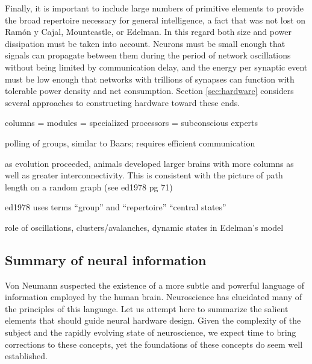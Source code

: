 Finally, it is important to include large numbers of primitive elements to provide the broad repertoire necessary for general intelligence, a fact that was not lost on Ram\'{o}n y Cajal, Mountcastle, or Edelman. In this regard both size and power dissipation must be taken into account. Neurons must be small enough that signals can propagate between them during the period of network oscillations without being limited by communication delay, and the energy per synaptic event must be low enough that networks with trillions of synapses can function with tolerable power density and net consumption. Section \ref{sec:hardware} considers several approaches to constructing hardware toward these ends.

\vspace{3em}
columns = modules = specialized processors = subconscious experts

\vspace{3em}
\cite{ed1978} polling of groups, similar to Baars; requires efficient communication

\vspace{3em}
as evolution proceeded, animals developed larger brains with more columns as well as greater interconnectivity. This is consistent with the picture of path length on a random graph (see ed1978 pg 71)

\vspace{3em}
ed1978 uses terms ``group'' and ``repertoire'' ``central states''

\vspace{3em}
role of oscillations, clusters/avalanches, dynamic states in Edelman's model

\vspace{3em}

\subsection{Summary of neural information}
Von Neumann suspected the existence of a more subtle and powerful language of information employed by the human brain. Neuroscience has elucidated many of the principles of this language. Let us attempt here to summarize the salient elements that should guide neural hardware design. Given the complexity of the subject and the rapidly evolving state of neuroscience, we expect time to bring corrections to these concepts, yet the foundations of these concepts do seem well established.

